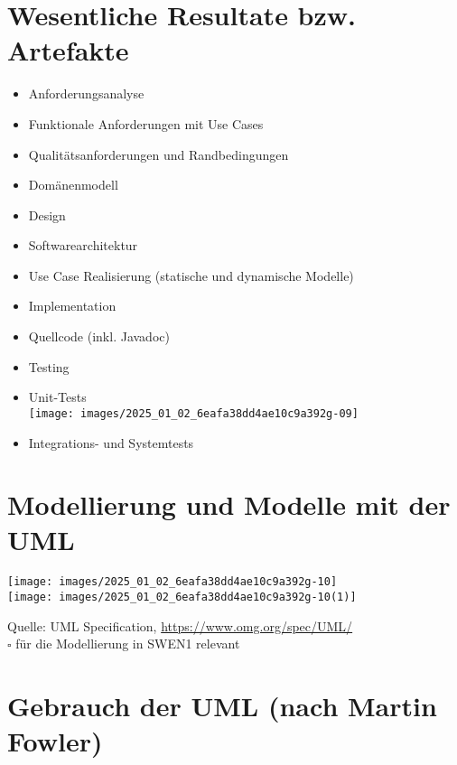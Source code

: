 \documentclass[10pt]{article}
\begin{document}
\section*{Wesentliche Resultate bzw. Artefakte}
\begin{itemize}
  \item Anforderungsanalyse
  \item Funktionale Anforderungen mit Use Cases
  \item Qualitätsanforderungen und Randbedingungen
  \item Domänenmodell
  \item Design
  \item Softwarearchitektur
  \item Use Case Realisierung (statische und dynamische Modelle)
  \item Implementation
  \item Quellcode (inkl. Javadoc)
  \item Testing
  \item Unit-Tests\\
\texttt{[image: images/2025\_01\_02\_6eafa38dd4ae10c9a392g-09]}
  \item Integrations- und Systemtests
\end{itemize}

\section*{Modellierung und Modelle mit der UML}
\texttt{[image: images/2025\_01\_02\_6eafa38dd4ae10c9a392g-10]}\\
\texttt{[image: images/2025\_01\_02\_6eafa38dd4ae10c9a392g-10(1)]}

Quelle: UML Specification, \href{https://www.omg.org/spec/UML/}{https://www.omg.org/spec/UML/}\\
$\square$ für die Modellierung in SWEN1 relevant

\section*{Gebrauch der UML (nach Martin Fowler)}
\end{document}
